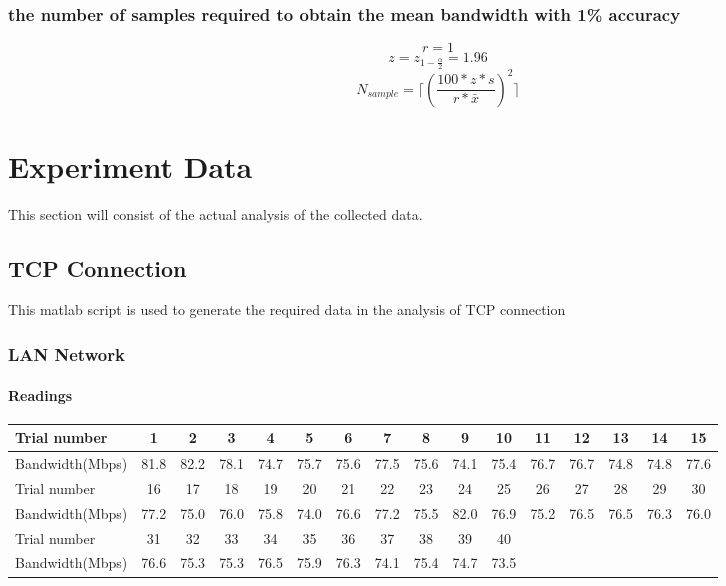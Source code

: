 \documentclass[aps,letterpaper,10pt]{revtex4}
\begin{document}
        \subsubsection{the number of samples required to obtain the mean bandwidth with 1\% accuracy}
            \[
            r = 1
            \]
            \[
            z = z_{1-\frac{\alpha}{2}} = 1.96
            \]
            \[
            N_{sample} = \lceil (\frac{100*z*s}{r*\bar{x}})^2 \rceil
            \]
           

\newpage
\section{Experiment Data}
This section will consist of the actual analysis of the collected data.  \vspace{5mm}
    \subsection{TCP Connection}
    This matlab script is used to generate the required data in the analysis of TCP connection    
    	
    	\vspace{3mm}
        \newpage
        \subsubsection{LAN Network}
            \paragraph{Readings}
                \begin{center}
                    \begin{tabular}{ ||l || c | c | c | c | c | c | c | c | c | c | c | c | c | c | c | }
                    \hline
                    Trial number & 1 & 2 & 3 & 4 & 5 & 6 & 7 & 8 & 9 & 10 & 11 & 12 & 13 & 14 & 15 \\ \hline
                    Bandwidth(Mbps) & 81.8 & 82.2 & 78.1 & 74.7 & 75.7 & 75.6 & 77.5 & 75.6 & 74.1 & 75.4 & 76.7 & 76.7 & 74.8 & 74.8 & 77.6\\
                    \hline   
                    \hline
                    Trial number & 16 & 17 & 18 & 19 & 20 & 21 & 22 & 23 & 24 & 25 & 26 & 27 & 28 & 29 & 30 \\ \hline 
                    Bandwidth(Mbps) & 77.2 & 75.0 & 76.0 & 75.8 & 74.0 & 76.6 & 77.2 & 75.5 & 82.0 & 76.9 & 75.2 & 76.5 & 76.5 & 76.3 & 76.0\\     
                    \hline    
                    \hline
                    Trial number & 31 & 32 & 33 & 34 & 35 & 36 & 37 & 38 & 39 & 40 & & & & & \\ \hline
                    Bandwidth(Mbps) & 76.6 & 75.3 & 75.3 & 76.5 & 75.9 & 76.3 & 74.1 & 75.4 & 74.7 & 73.5 & & & & &\\
                    \hline
                    \end{tabular}
                \end{center}
                \vspace{3mm}
\end{document}
